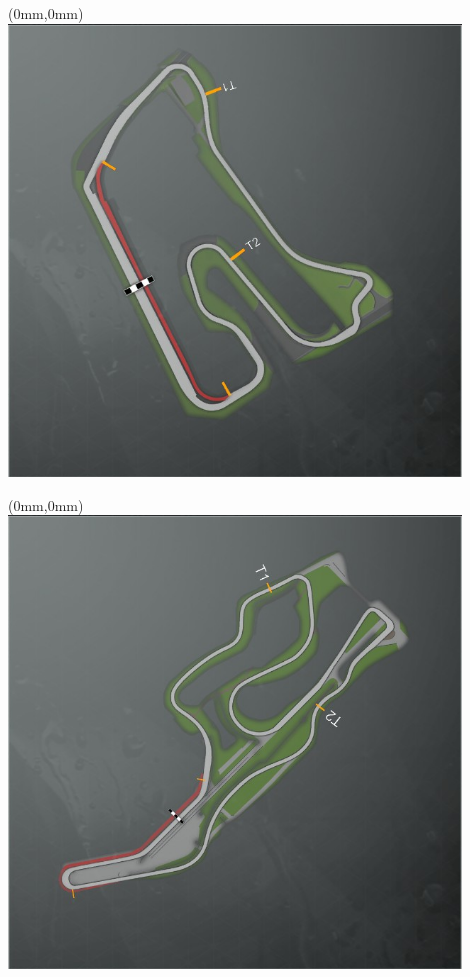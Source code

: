 \null\newpage
\begin{textblock*}{30mm}(0mm,0mm)%
\includegraphics[width=120mm]{TR/2015-05-20_00029.png}
\end{textblock*}
\null\newpage
\begin{textblock*}{30mm}(0mm,0mm)%
\includegraphics[width=120mm]{TR/2015-05-20_00065.png}
\end{textblock*}
